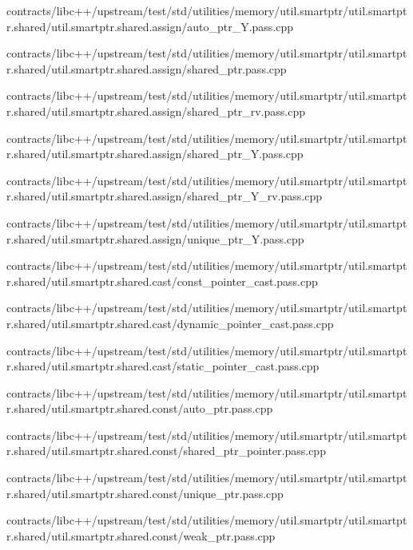 \begin{DoxyCompactItemize}
contracts/libc++/upstream/test/std/utilities/memory/util.\+smartptr/util.\+smartptr.\+shared/util.\+smartptr.\+shared.\+assign/auto\+\_\+ptr\+\_\+\+Y.\+pass.\+cpp\item 
contracts/libc++/upstream/test/std/utilities/memory/util.\+smartptr/util.\+smartptr.\+shared/util.\+smartptr.\+shared.\+assign/shared\+\_\+ptr.\+pass.\+cpp\item 
contracts/libc++/upstream/test/std/utilities/memory/util.\+smartptr/util.\+smartptr.\+shared/util.\+smartptr.\+shared.\+assign/shared\+\_\+ptr\+\_\+rv.\+pass.\+cpp\item 
contracts/libc++/upstream/test/std/utilities/memory/util.\+smartptr/util.\+smartptr.\+shared/util.\+smartptr.\+shared.\+assign/shared\+\_\+ptr\+\_\+\+Y.\+pass.\+cpp\item 
contracts/libc++/upstream/test/std/utilities/memory/util.\+smartptr/util.\+smartptr.\+shared/util.\+smartptr.\+shared.\+assign/shared\+\_\+ptr\+\_\+\+Y\+\_\+rv.\+pass.\+cpp\item 
contracts/libc++/upstream/test/std/utilities/memory/util.\+smartptr/util.\+smartptr.\+shared/util.\+smartptr.\+shared.\+assign/unique\+\_\+ptr\+\_\+\+Y.\+pass.\+cpp\item 
contracts/libc++/upstream/test/std/utilities/memory/util.\+smartptr/util.\+smartptr.\+shared/util.\+smartptr.\+shared.\+cast/const\+\_\+pointer\+\_\+cast.\+pass.\+cpp\item 
contracts/libc++/upstream/test/std/utilities/memory/util.\+smartptr/util.\+smartptr.\+shared/util.\+smartptr.\+shared.\+cast/dynamic\+\_\+pointer\+\_\+cast.\+pass.\+cpp\item 
contracts/libc++/upstream/test/std/utilities/memory/util.\+smartptr/util.\+smartptr.\+shared/util.\+smartptr.\+shared.\+cast/static\+\_\+pointer\+\_\+cast.\+pass.\+cpp\item 
contracts/libc++/upstream/test/std/utilities/memory/util.\+smartptr/util.\+smartptr.\+shared/util.\+smartptr.\+shared.\+const/auto\+\_\+ptr.\+pass.\+cpp\item 
contracts/libc++/upstream/test/std/utilities/memory/util.\+smartptr/util.\+smartptr.\+shared/util.\+smartptr.\+shared.\+const/shared\+\_\+ptr\+\_\+pointer.\+pass.\+cpp\item 
contracts/libc++/upstream/test/std/utilities/memory/util.\+smartptr/util.\+smartptr.\+shared/util.\+smartptr.\+shared.\+const/unique\+\_\+ptr.\+pass.\+cpp\item 
contracts/libc++/upstream/test/std/utilities/memory/util.\+smartptr/util.\+smartptr.\+shared/util.\+smartptr.\+shared.\+const/weak\+\_\+ptr.\+pass.\+cpp\item 

\end{DoxyCompactItemize}
